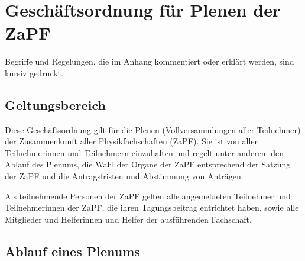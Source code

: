 \documentclass[draft,12pt,oneside]{scrreprt}
\begin{document}
\chapter*{Geschäftsordnung für Plenen der ZaPF}

Begriffe und Regelungen, die im Anhang kommentiert oder erklärt werden, sind
kursiv gedruckt.

\section{Geltungsbereich}

Diese Geschäftsordnung gilt für die Plenen (Vollversammlungen aller Teilnehmer)
der Zusammenkunft aller Physikfachschaften (ZaPF).
Sie ist von allen Teilnehmerinnen und Teilnehmern einzuhalten und regelt unter
anderem den Ablauf des Plenums, die Wahl der Organe der ZaPF entsprechend der
Satzung der ZaPF und die Antragsfristen und Abstimmung von Anträgen.

Als teilnehmende Personen der ZaPF gelten alle angemeldeten Teilnehmer und
Teilnehmerinnen der ZaPF, die ihren Tagungsbeitrag entrichtet haben, sowie alle
Mitglieder und Helferinnen und Helfer der ausführenden Fachschaft.

\section{Ablauf eines Plenums}
\end{document}
